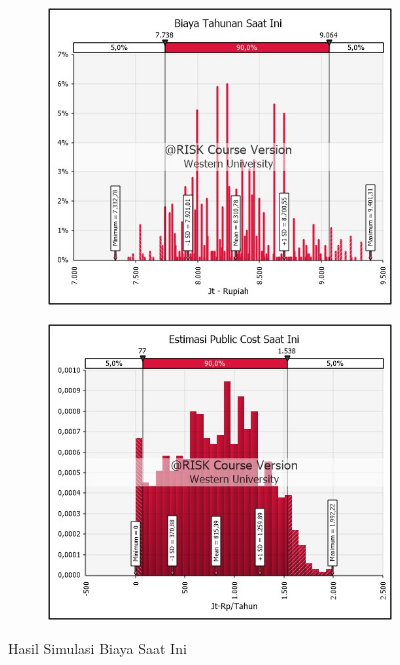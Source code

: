 \begin{figure}[!ht]
    \centering
    \begin{subfigure}{0.48\textwidth}
        \centering
        \includegraphics[width=\textwidth]{grafik/biaya-tahunan-saat-ini.jpg}
    \end{subfigure}
    \hfill  %
    \begin{subfigure}{0.48\textwidth}
        \centering
        \includegraphics[width=\textwidth]{grafik/biaya-publik-saat-ini.jpg}
    \end{subfigure}
    \caption{Hasil Simulasi Biaya Saat Ini}
    \label{fig:biaya-saat-ini}
\end{figure}



